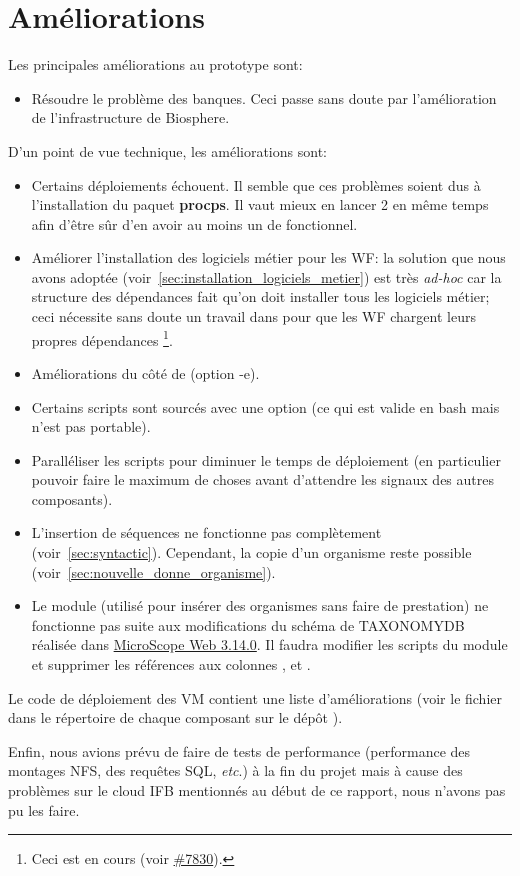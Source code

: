 \section{Améliorations}

Les principales améliorations au prototype sont:
\begin{itemize}
    \item Résoudre le problème des banques.
          Ceci passe sans doute par l'amélioration de l'infrastructure de Biosphere.
\end{itemize}


D'un point de vue technique, les améliorations sont:
\begin{itemize}
    \item Certains déploiements échouent.
          Il semble que ces problèmes soient dus à l'installation du paquet \textbf{procps}.
          Il vaut mieux en lancer 2 en même temps afin d'être sûr d'en avoir au moins un de fonctionnel.
    \item Améliorer l'installation des logiciels métier pour les WF:
          la solution que nous avons adoptée (voir~\autoref{sec:installation_logiciels_metier}) est très \textit{ad-hoc}
          car la structure des dépendances fait qu'on doit installer tous les logiciels métier;
          ceci nécessite sans doute un travail dans  pour que les WF chargent leurs propres dépendances
          \footnote{Ceci est en cours (voir \href{https://intranet.genoscope.cns.fr/agc/redmine/issues/7830}{\#7830}).}.
    \item Améliorations du côté de  (option -e).
    \item Certains scripts sont sourcés avec une option (ce qui est valide en bash mais n'est pas portable).
    \item Paralléliser les scripts pour diminuer le temps de déploiement (en particulier pouvoir faire le maximum de choses avant d'attendre les signaux des autres composants).
    \item L'insertion de séquences ne fonctionne pas complètement (voir~\autoref{sec:syntactic}).
          Cependant, la copie d'un organisme reste possible (voir~\autoref{sec:nouvelle_donne_organisme}).
    \item Le module  (utilisé pour insérer des organismes sans faire de prestation)
          ne fonctionne pas suite aux modifications du schéma de TAXONOMYDB réalisée dans \href{https://intranet.genoscope.cns.fr/agc/redmine/versions/142}{MicroScope Web 3.14.0}.
          Il faudra modifier les scripts du module et supprimer les références aux colonnes ,  et .
\end{itemize}

Le code de déploiement des VM contient une liste d'améliorations (voir le fichier  dans le répertoire de chaque composant sur le dépôt ).

Enfin, nous avions prévu de faire de tests de performance (performance des montages NFS, des requêtes SQL, \textit{etc}.)
à la fin du projet
mais à cause des problèmes sur le cloud IFB mentionnés au début de ce rapport,
nous n'avons pas pu les faire.
